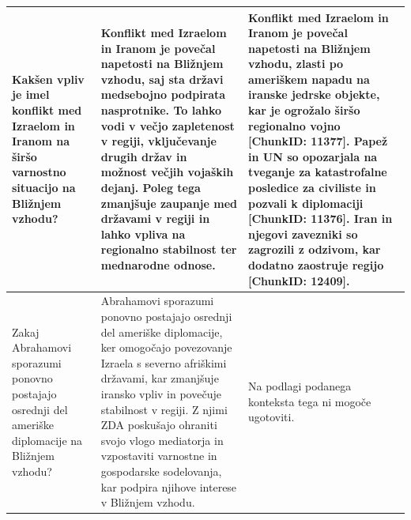 \documentclass[conference]{IEEEtran}
\begin{document}
\begin{longtable}{p{} p{} p{}}
Kakšen vpliv je imel konflikt med Izraelom in Iranom na širšo varnostno situacijo na Bližnjem vzhodu? & Konflikt med Izraelom in Iranom je povečal napetosti na Bližnjem vzhodu, saj sta državi medsebojno podpirata nasprotnike. To lahko vodi v večjo zapletenost v regiji, vključevanje drugih držav in možnost večjih vojaških dejanj. Poleg tega zmanjšuje zaupanje med državami v regiji in lahko vpliva na regionalno stabilnost ter mednarodne odnose. & Konflikt med Izraelom in Iranom je povečal napetosti na Bližnjem vzhodu, zlasti po ameriškem napadu na iranske jedrske objekte, kar je ogrožalo širšo regionalno vojno [ChunkID: 11377]. Papež in UN so opozarjala na tveganje za katastrofalne posledice za civiliste in pozvali k diplomaciji [ChunkID: 11376]. Iran in njegovi zavezniki so zagrozili z odzivom, kar dodatno zaostruje regijo [ChunkID: 12409]. \\ \hline
Zakaj Abrahamovi sporazumi ponovno postajajo osrednji del ameriške diplomacije na Bližnjem vzhodu? & Abrahamovi sporazumi ponovno postajajo osrednji del ameriške diplomacije, ker omogočajo povezovanje Izraela s severno afriškimi državami, kar zmanjšuje iransko vpliv in povečuje stabilnost v regiji. Z njimi ZDA poskušajo ohraniti svojo vlogo mediatorja in vzpostaviti varnostne in gospodarske sodelovanja, kar podpira njihove interese v Bližnjem vzhodu. & Na podlagi podanega konteksta tega ni mogoče ugotoviti. \\ \hline

\end{longtable}
\end{document}
